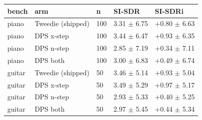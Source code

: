 \begin{tabular}{lllll}
\toprule
bench & arm & n & SI-SDR & SI-SDRi\\
\midrule
piano & Tweedie (shipped) & 100 & 3.31 $\pm$ 6.75 & +0.80 $\pm$ 6.63\\
piano & DPS x-step & 100 & 3.44 $\pm$ 6.47 & +0.93 $\pm$ 6.35\\
piano & DPS n-step & 100 & 2.85 $\pm$ 7.19 & +0.34 $\pm$ 7.11\\
piano & DPS both & 100 & 3.00 $\pm$ 6.83 & +0.49 $\pm$ 6.74\\
guitar & Tweedie (shipped) & 50 & 3.46 $\pm$ 5.14 & +0.93 $\pm$ 5.04\\
guitar & DPS x-step & 50 & 3.49 $\pm$ 5.29 & +0.97 $\pm$ 5.17\\
guitar & DPS n-step & 50 & 2.93 $\pm$ 5.33 & +0.40 $\pm$ 5.25\\
guitar & DPS both & 50 & 2.97 $\pm$ 5.45 & +0.44 $\pm$ 5.34\\
\bottomrule
\end{tabular}
